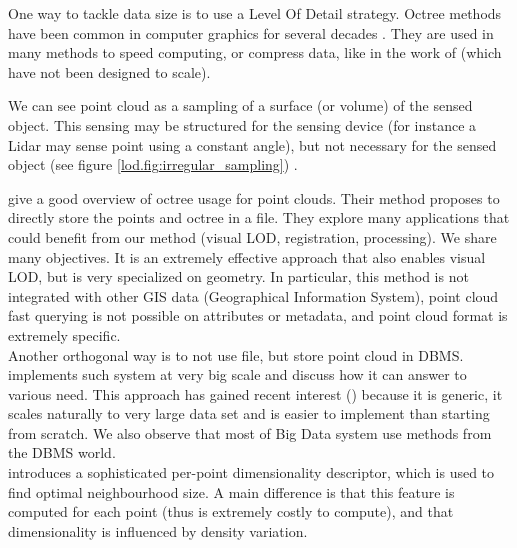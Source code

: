         
        
		One way to tackle data size is to use a Level Of Detail strategy. Octree methods have been common in computer graphics for several decades \citep{Meagher1982}. They are used in many methods to speed computing, or compress data, like in the work of \cite{Schnabel2006,Huang2006} (which have not been designed to scale).
		
		
		We can see point cloud as a sampling of a surface (or volume) of the sensed object. This sensing may be structured for the sensing device (for instance a Lidar may sense point using a constant angle), but not necessary for the sensed object (see figure \ref{lod.fig:irregular_sampling})
		.
		
		\cite{Elseberg2013} give a good overview of octree usage for point clouds. Their method proposes to directly store the points and octree in a file. They explore many applications that could benefit from our method (visual LOD, registration, processing). We share many objectives. It is an extremely effective approach that also enables visual LOD, but is very specialized on geometry. In particular, this method is not integrated with other GIS data (Geographical Information System), point cloud fast querying is not possible on attributes or metadata, and point cloud format is extremely specific.
		\\
		Another orthogonal way is to not use file, but store point cloud in DBMS.  \cite{vanOosterom2014} implements such system at very big scale and discuss how it can answer to various need. This approach has gained recent interest (\cite{pgPointCloud2014}) because it is generic, it scales naturally to very large data set and is easier to implement than starting from scratch. We also observe that most of Big Data system use methods from the DBMS world.
		\\ 
		\cite{Demantke2014} introduces a sophisticated per-point dimensionality descriptor, which is used to find optimal neighbourhood size. A main difference is that this feature is computed for each point (thus is extremely costly to compute), and that dimensionality is influenced by density variation.
		
